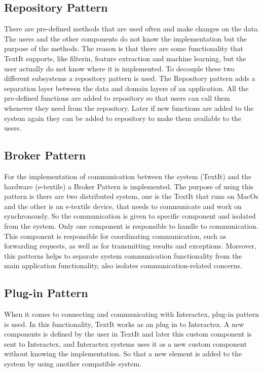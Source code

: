 \subsection{Repository Pattern}
There are pre-defined methods that are used often and make changes on the data. The users and the other components do not know the implementation but the purpose of the methods. The reason is that there are some functionality that TextIt supports, like filterin, feature extraction and machine learning, but the user actually do not know where it is implemented. To decouple these two different subsystems a repository pattern is used. The Repository pattern adds a separation layer between the data and domain layers of an application. All the pre-defined functions are added to repository so that users can call them whenever they need from the repository. Later if new functions are added to the system again they can be added to repository to make them available to the users. 

\subsection{Broker Pattern}
For the implementation of communication between the system (TextIt) and the hardware (e-textile) a Broker Pattern is implemented. The purpose of using this pattern is there are two distributed system, one is the TextIt that runs on MacOs and the other is an e-textile device, that needs to communicate and work on synchronously. So the communication is given to specific component and isolated from the system. Only one component is responsible to handle to communication. This component is responsible for coordinating communication, such as forwarding requests, as well as for transmitting results and exceptions. Moreover, this patterns helps to separate system communication functionality from the main application functionality, also isolates communication-related concerns.

\subsection{Plug-in Pattern}
When it comes to connecting and communicating with Interactex, plug-in pattern is used. In this functionality, TextIt works as an plug in to Interactex. A new components is defined by the user in TextIt and later this custom component is sent to Interactex, and Interactex systems uses it as a new custom component without knowing the implementation. So that a new element is added to the system by using another compatible system.  

